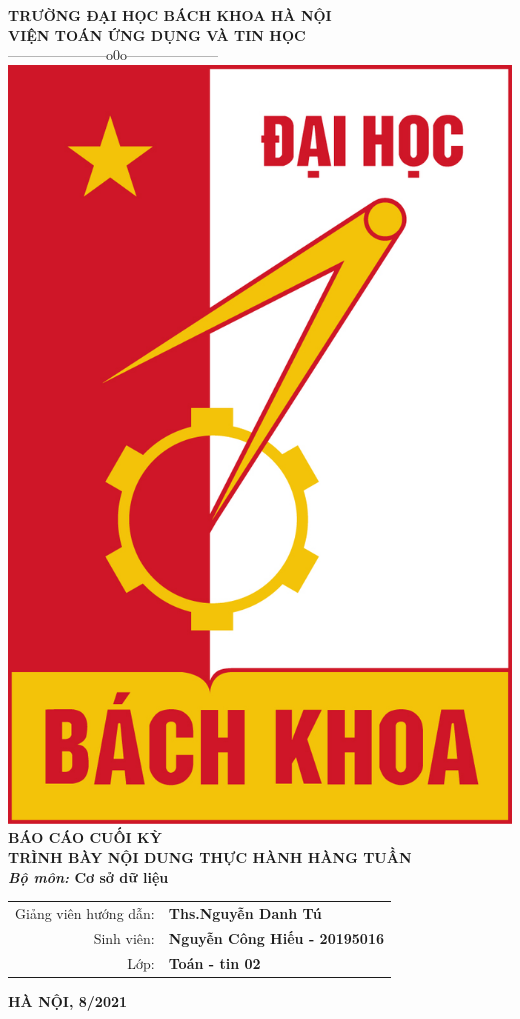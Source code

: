 \documentclass[12pt,a4paper]{report}
\begin{document}
 

\fontsize{13pt}{18pt}\selectfont   %

\setlength{\baselineskip}{18truept}
\begin{titlepage}                                                       %
\begin{center}
{\large\bf TRƯỜNG ĐẠI HỌC BÁCH KHOA HÀ NỘI}\\
{\large\bf VIỆN TOÁN ỨNG DỤNG VÀ TIN HỌC} \\
{---------------------o0o--------------------}
\vskip 1cm
\includegraphics[scale=0.4]{Logo HUST}
\vskip 2cm
{\bf BÁO CÁO CUỐI KỲ}\\[1cm]
{\Large\bf \textbf{TRÌNH BÀY NỘI DUNG THỰC HÀNH HÀNG TUẦN}}\\
\vskip 1cm
{\bf {\it Bộ môn:}  Cơ sở dữ liệu}
\vskip 2cm

\begin{tabular}{r l}
Giảng viên hướng dẫn:&{\bf Ths.Nguyễn Danh Tú}\\[0.5cm]
Sinh viên:&{\bf Nguyễn Công Hiếu - 20195016}\\[0.5cm]
Lớp:&{\bf Toán - tin 02}
\end{tabular}
\vfill
{\bf HÀ NỘI, 8/2021}
\end{center}
\end{titlepage}
\end{document}
